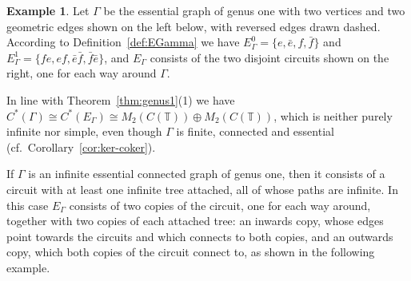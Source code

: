 \documentclass[12pt,reqno]{amsart}
\theoremstyle{plain}
\theoremstyle{definition}
\newtheorem{example}[theorem]{Example}
\newcommand{\T}{\mathbb{T}}
\begin{document}
\begin{example}\label{ex:genus-one}
Let $\Gamma$ be the essential graph of genus one with two vertices and two geometric edges shown on
the left below, with reversed edges drawn dashed. According to Definition~\ref{def:EGamma} we have
$E_\Gamma^0=\{e,\bar e,f,\bar f\}$ and $E_\Gamma^1=\{fe,ef,\bar e\bar f,\bar f\bar e\}$, and
$E_\Gamma$ consists of the two disjoint circuits shown on the right, one for each way around
$\Gamma$.
\begin{center}
\end{center}
In line with Theorem~\ref{thm:genus1}(1) we have $C^*(\Gamma)\cong C^*(E_\Gamma)\cong M_2(C(\T))\oplus M_2(C(\T))$, which is neither purely
infinite nor simple, even though $\Gamma$ is finite, connected and essential (cf.\
Corollary~\ref{cor:ker-coker}).
\end{example}


If $\Gamma$ is an infinite essential connected graph of genus one, then it consists of a circuit
with at least one infinite tree attached, all of whose paths are infinite. In this case $E_\Gamma$
consists of two copies of the circuit, one for each way around, together with two copies of each
attached tree: an inwards copy, whose edges point towards the circuits and which connects to both
copies, and an outwards copy, which both copies of the circuit connect to, as shown in the
following example.
\end{document}
